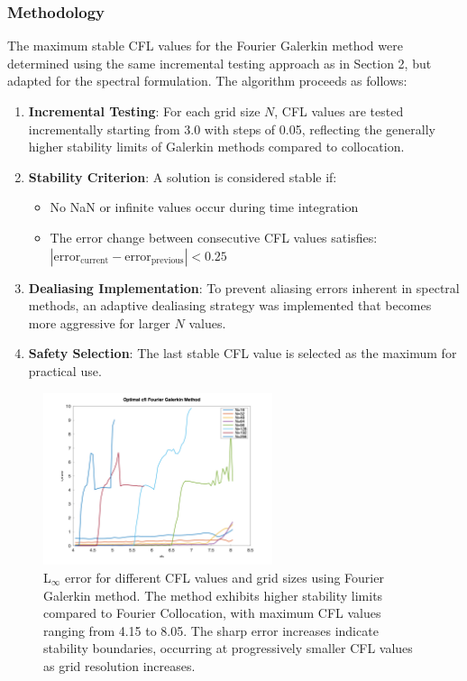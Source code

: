 \subsubsection{Methodology}
The maximum stable CFL values for the Fourier Galerkin method were determined using the same incremental testing approach as in Section 2, but adapted for the spectral formulation. The algorithm proceeds as follows:

\begin{enumerate}
	\item \textbf{Incremental Testing}: For each grid size $N$, CFL values are tested incrementally starting from 3.0 with steps of 0.05, reflecting the generally higher stability limits of Galerkin methods compared to collocation.
	\item \textbf{Stability Criterion}: A solution is considered stable if:
	      \begin{itemize}
		      \item No NaN or infinite values occur during time integration
		      \item The error change between consecutive CFL values satisfies: $|\text{error}_{\text{current}} - \text{error}_{\text{previous}}| < 0.25$
	      \end{itemize}
	\item \textbf{Dealiasing Implementation}: To prevent aliasing errors inherent in spectral methods, an adaptive dealiasing strategy was implemented that becomes more aggressive for larger $N$ values.
	\item \textbf{Safety Selection}: The last stable CFL value is selected as the maximum for practical use.
\end{enumerate}

\begin{figure}[H]
	\centering
	\includegraphics[width=0.6\textwidth]{media/cfl_errors_fg_complete.png}
	\caption{L$_\infty$ error for different CFL values and grid sizes using Fourier Galerkin method. The method exhibits higher stability limits compared to Fourier Collocation, with maximum CFL values ranging from 4.15 to 8.05. The sharp error increases indicate stability boundaries, occurring at progressively smaller CFL values as grid resolution increases.}
	\label{fig:cfl_fg}
\end{figure}


